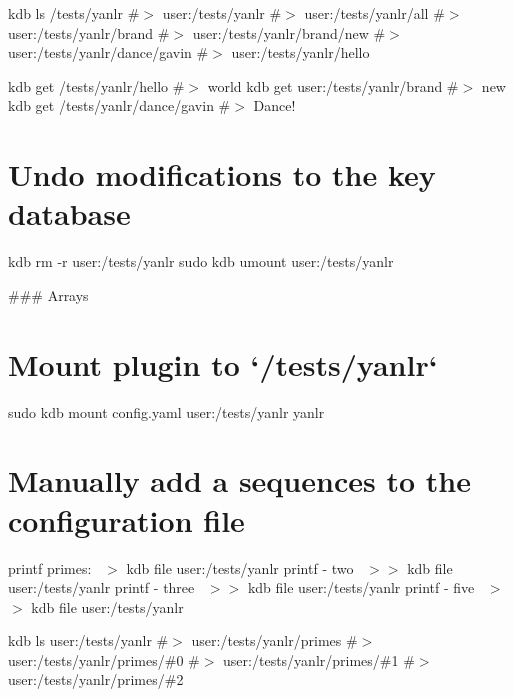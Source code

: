 kdb ls /tests/yanlr \#$>$ user\+:/tests/yanlr \#$>$ user\+:/tests/yanlr/all \#$>$ user\+:/tests/yanlr/brand \#$>$ user\+:/tests/yanlr/brand/new \#$>$ user\+:/tests/yanlr/dance/gavin \#$>$ user\+:/tests/yanlr/hello

kdb get /tests/yanlr/hello \#$>$ world kdb get user\+:/tests/yanlr/brand \#$>$ new kdb get /tests/yanlr/dance/gavin \#$>$ Dance!\hypertarget{autotoc_md897_autotoc_md910}{}\section{Undo modifications to the key database}\label{autotoc_md897_autotoc_md910}
kdb rm -\/r user\+:/tests/yanlr sudo kdb umount user\+:/tests/yanlr 
\begin{DoxyCode}
### Arrays
\end{DoxyCode}
 \hypertarget{autotoc_md897_autotoc_md911}{}\section{Mount plugin to `/tests/yanlr`}\label{autotoc_md897_autotoc_md911}
sudo kdb mount config.\+yaml user\+:/tests/yanlr yanlr\hypertarget{autotoc_md897_autotoc_md912}{}\section{Manually add a sequences to the configuration file}\label{autotoc_md897_autotoc_md912}
printf \textquotesingle{}primes\+:~\newline
\textquotesingle{} $>$ {\ttfamily kdb file user\+:/tests/yanlr} printf \textquotesingle{} -\/ two~\newline
\textquotesingle{} $>$$>$ {\ttfamily kdb file user\+:/tests/yanlr} printf \textquotesingle{} -\/ three~\newline
\textquotesingle{} $>$$>$ {\ttfamily kdb file user\+:/tests/yanlr} printf \textquotesingle{} -\/ five~\newline
\textquotesingle{} $>$$>$ {\ttfamily kdb file user\+:/tests/yanlr}

kdb ls user\+:/tests/yanlr \#$>$ user\+:/tests/yanlr/primes \#$>$ user\+:/tests/yanlr/primes/\#0 \#$>$ user\+:/tests/yanlr/primes/\#1 \#$>$ user\+:/tests/yanlr/primes/\#2

